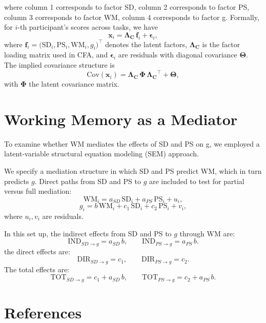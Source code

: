 \documentclass[
  ,man]{apa6}
\begin{document}
where column 1 corresponds to factor SD, column 2 corresponds to factor PS, column 3 corresponds to factor WM, column 4 corresponds to factor g. Formally, for \(i\)-th participant's scores across tasks, we have
\[
\boldsymbol{x}_i = \boldsymbol{\Lambda_C}\,\mathbf{f}_i + \boldsymbol{\epsilon}_i,
\]
where \(\mathbf{f}_i = \big(\text{SD}_i, \text{PS}_i, \text{WM}_i, g_i\big)^\top\) denotes the latent factors, \(\boldsymbol{\Lambda_C}\) is the factor loading matrix used in CFA, and \(\boldsymbol{\epsilon}_i\) are residuals with diagonal covariance \(\boldsymbol{\Theta}\). The implied covariance structure is
\[
\text{Cov}(\boldsymbol{x}_i) = \boldsymbol{\Lambda_C}\,\boldsymbol{\Phi}\,\boldsymbol{\Lambda_C}^\top + \boldsymbol{\Theta},
\]
with \(\boldsymbol{\Phi}\) the latent covariance matrix.

\section{Working Memory as a Mediator}\label{working-memory-as-a-mediator}

To examine whether WM mediates the effects of SD and PS on g, we employed a latent-variable structural equation modeling (SEM) approach.

We specify a mediation structure in which SD and PS predict WM, which in turn predicts \(g\). Direct paths from SD and PS to \(g\) are included to test for partial versus full mediation:
\[
\text{WM}_i = a_{SD}\,\text{SD}_i + a_{PS}\,\text{PS}_i + u_i,
\]
\[
g_i = b\,\text{WM}_i + c_1\,\text{SD}_i + c_2\,\text{PS}_i + v_i,
\]
where \(u_i, v_i\) are residuals.

In this set up, the indirect effects from SD and PS to \(g\) through WM are:
\[
\text{IND}_{SD\to g} = a_{SD}\,b, \qquad
\text{IND}_{PS\to g} = a_{PS}\,b.
\]
the direct effects are:
\[
\text{DIR}_{SD\to g} = c_1, \qquad \text{DIR}_{PS\to g} = c_2.
\]
The total effects are:
\[
\text{TOT}_{SD\to g} = c_1 + a_{SD}\,b, \qquad
\text{TOT}_{PS\to g} = c_2 + a_{PS}\,b.
\]

\newpage

\section*{References}\label{references}
\end{document}
